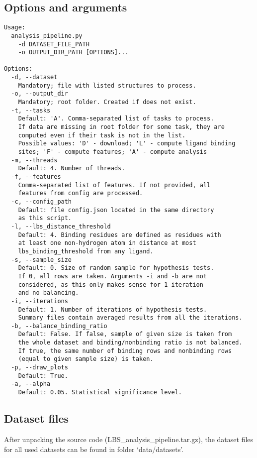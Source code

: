 \documentclass[12pt,a4paper]{report}
\begin{document}
\subsection{Options and arguments}
\begin{Verbatim}[fontsize=\small]
Usage:
  analysis_pipeline.py 
  	-d DATASET_FILE_PATH
  	-o OUTPUT_DIR_PATH [OPTIONS]... 

Options:
  -d, --dataset                
  	Mandatory; file with listed structures to process.
  -o, --output_dir             
  	Mandatory; root folder. Created if does not exist.
  -t, --tasks                  
  	Default: 'A'. Comma-separated list of tasks to process. 
  	If data are missing in root folder for some task, they are 
  	computed even if their task is not in the list.
  	Possible values: 'D' - download; 'L' - compute ligand binding 
  	sites; 'F' - compute features; 'A' - compute analysis
  -m, --threads                
  	Default: 4. Number of threads.
  -f, --features               
  	Comma-separated list of features. If not provided, all
  	features from config are processed.
  -c, --config_path            
  	Default: file config.json located in the same directory 
  	as this script.
  -l, --lbs_distance_threshold 
  	Default: 4. Binding residues are defined as residues with 
  	at least one non-hydrogen atom in distance at most 
  	lbs_binding_threshold from any ligand.
  -s, --sample_size            
  	Default: 0. Size of random sample for hypothesis tests. 
  	If 0, all rows are taken. Arguments -i and -b are not
  	considered, as this only makes sense for 1 iteration
  	and no balancing.
  -i, --iterations             
  	Default: 1. Number of iterations of hypothesis tests. 
  	Summary files contain averaged results from all the iterations.
  -b, --balance_binding_ratio  
  	Default: False. If false, sample of given size is taken from
  	the whole dataset and binding/nonbinding ratio is not balanced. 
  	If true, the same number of binding rows and nonbinding rows
  	(equal to given sample size) is taken. 
  -p, --draw_plots             
  	Default: True.
  -a, --alpha                  
  	Default: 0.05. Statistical significance level. 
\end{Verbatim}


\subsection{Dataset files}
After unpacking the source code (LBS\_analysis\_pipeline.tar.gz), the dataset files for all used datasets can be found in folder `data/datasets'.
\end{document}
